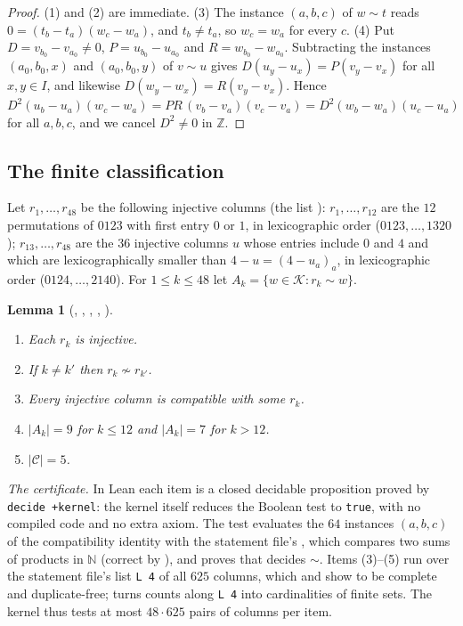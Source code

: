 \documentclass[11pt]{amsart}
\theoremstyle{plain}
\newtheorem{lemma}[theorem]{Lemma}
\theoremstyle{definition}
\newcommand{\N}{\mathbb{N}}
\newcommand{\Z}{\mathbb{Z}}
\newcommand{\cK}{\mathcal{K}}
\newcommand{\cC}{\mathcal{C}}
\begin{document}
\begin{proof}
(1) and (2) are immediate. (3) The instance $(a,b,c)$ of $w\sim t$ reads $0=(t_b-t_a)(w_c-w_a)$, and $t_b\ne t_a$, so $w_c=w_a$ for every $c$.
(4) Put $D=v_{b_0}-v_{a_0}\ne0$, $P=u_{b_0}-u_{a_0}$ and $R=w_{b_0}-w_{a_0}$. Subtracting the instances $(a_0,b_0,x)$ and $(a_0,b_0,y)$ of $v\sim u$ gives $D(u_y-u_x)=P(v_y-v_x)$ for all $x,y\in I$, and likewise $D(w_y-w_x)=R(v_y-v_x)$. Hence $D^2(u_b-u_a)(w_c-w_a)=PR\,(v_b-v_a)(v_c-v_a)=D^2(w_b-w_a)(u_c-u_a)$ for all $a,b,c$, and we cancel $D^2\ne0$ in $\Z$.
\end{proof}

\subsection{The finite classification}
Let $r_1,\dots,r_{48}$ be the following injective columns (the list ):
$r_1,\dots,r_{12}$ are the $12$ permutations of $0123$ with first entry $0$ or $1$, in lexicographic order ($0123,\dots,1320$);
$r_{13},\dots,r_{48}$ are the $36$ injective columns $u$ whose entries include $0$ and $4$ and which are lexicographically smaller than $4-u=(4-u_a)_a$, in lexicographic order ($0124,\dots,2140$).
For $1\le k\le48$ let $A_k=\{w\in\cK: r_k\sim w\}$.

\begin{lemma}[, , , , ]\label{lem:finite}
\leavevmode
\begin{enumerate}
\item Each $r_k$ is injective.
\item If $k\ne k'$ then $r_k\not\sim r_{k'}$.
\item Every injective column is compatible with some $r_k$.
\item $|A_k|=9$ for $k\le12$ and $|A_k|=7$ for $k>12$.
\item $|\cC|=5$.
\end{enumerate}
\end{lemma}

\emph{The certificate.} In Lean each item is a closed decidable proposition proved by \texttt{decide +kernel}: the kernel itself reduces the Boolean test to \texttt{true}, with no compiled code and no extra axiom. The test  evaluates the $64$ instances $(a,b,c)$ of the compatibility identity with the statement file's , which compares two sums of products in $\N$ (correct by ), and  proves that  decides $\sim$. Items (3)--(5) run over the statement file's list \texttt{L 4} of all $625$ columns, which  and  show to be complete and duplicate-free;  turns counts along \texttt{L 4} into cardinalities of finite sets. The kernel thus tests at most $48\cdot625$ pairs of columns per item.
\end{document}
